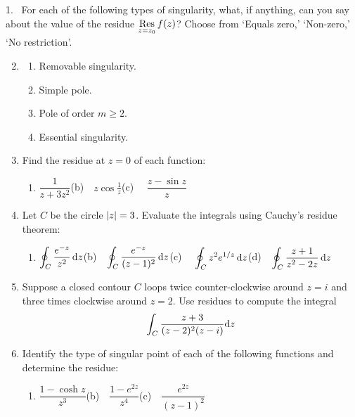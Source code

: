 \goodbreak

\begin{exercises*}
\hangindent\leftmargini
\textup{1.} \ For each of the following types of singularity, what, if anything, can you say about the value of the residue $\operatorname*{Res}\limits_{z=z_0}f(z)$? Choose from `Equals zero,' `Non-zero,' `No restriction'.\vspace{-5pt}
\begin{enumerate}\setcounter{enumi}{1}
  \item[]\begin{enumerate}
	  \item Removable singularity.
	  \item Simple pole.
	  \item Pole of order $m\ge 2$.
	  \item Essential singularity.
	\end{enumerate}
	
  \item	Find the residue at $z=0$ of each function:
  \begin{enumerate}
    \item $\dfrac 1{z+3z^2}$\qquad (b)\ \ $\displaystyle z\cos\frac 1z$\qquad (c) \ \ $\dfrac{z-\sin z}{z}$
	\end{enumerate}
	
	\item Let $C$ be the circle $\left| z\right|=3$. Evaluate the integrals using Cauchy's residue theorem:
  \begin{enumerate}
    \item $\displaystyle\oint_C\frac{e^{-z}}{z^2}\,{\mathrm{d} z}$\qquad (b)\ \ $\displaystyle\oint_C\frac{e^{-z}}{(z-1)^2}\,{\mathrm{d} z}$\qquad (c) \ \ $\displaystyle\oint_Cz^2e^{1/z}\,{\mathrm{d} z}$\qquad (d)\ \ $\displaystyle\oint_C\frac{z+1}{z^2-2z}\,{\mathrm{d} z}$
	\end{enumerate}
	
	\item Suppose a closed contour $C$ loops twice counter-clockwise around $z=i$ and three times clockwise around $z=2$. Use residues to compute the integral
	\[\int_C\frac{z+3}{(z-2)^2(z-i)}{\mathrm{d} z}\]
	
	\item Identify the type of singular point of each of the following functions and determine the residue:
	\begin{enumerate}
	  \item $\dfrac{1-\cosh z}{z^3}$\qquad (b)\ \ $\dfrac{1-e^{2z}}{z^4}$\qquad (c)\ \ $\dfrac{e^{2z}}{(z-1)^2}$
	\end{enumerate}
	

\end{enumerate}
\end{exercises*}
